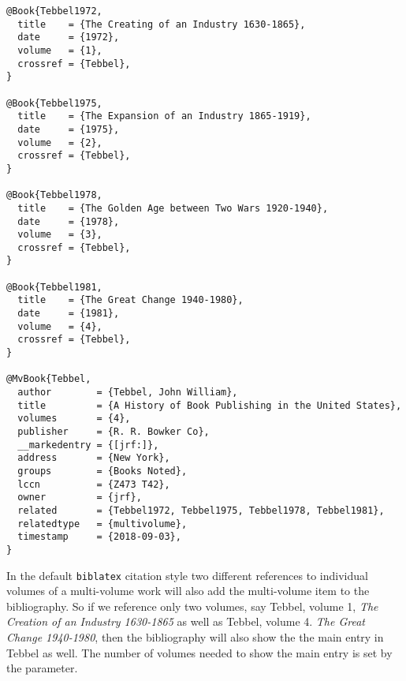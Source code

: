 \documentclass{article}
\begin{document}
\begin{verbatim}
@Book{Tebbel1972,
  title    = {The Creating of an Industry 1630-1865},
  date     = {1972},
  volume   = {1},
  crossref = {Tebbel},
}

@Book{Tebbel1975,
  title    = {The Expansion of an Industry 1865-1919},
  date     = {1975},
  volume   = {2},
  crossref = {Tebbel},
}

@Book{Tebbel1978,
  title    = {The Golden Age between Two Wars 1920-1940},
  date     = {1978},
  volume   = {3},
  crossref = {Tebbel},
}

@Book{Tebbel1981,
  title    = {The Great Change 1940-1980},
  date     = {1981},
  volume   = {4},
  crossref = {Tebbel},
}

@MvBook{Tebbel,
  author        = {Tebbel, John William},
  title         = {A History of Book Publishing in the United States},
  volumes       = {4},
  publisher     = {R. R. Bowker Co},
  __markedentry = {[jrf:]},
  address       = {New York},
  groups        = {Books Noted},
  lccn          = {Z473 T42},
  owner         = {jrf},
  related       = {Tebbel1972, Tebbel1975, Tebbel1978, Tebbel1981},
  relatedtype   = {multivolume},
  timestamp     = {2018-09-03},
}
\end{verbatim}

In the default {\tt biblatex} citation style two different references
to individual volumes of a multi-volume work will also add the
multi-volume item to the bibliography. So if we reference only two
volumes, say Tebbel, volume 1, {\it The Creation of an Industry
  1630-1865}\cite{Tebbel1972} as well as Tebbel, volume 4. {\it The
  Great Change 1940-1980}\cite{Tebbel1981}, then the bibliography will
also show the the main entry in Tebbel as well. The number of volumes
needed to show the main entry is set by the parameter.


\vfil\eject

\printbibliography
\end{document}

